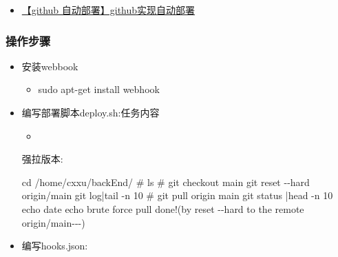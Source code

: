 \documentclass[
]{article}
\newenvironment{Shaded}{}{}
\newcommand{\NormalTok}[1]{#1}
\begin{document}
\begin{itemize}
\item
  \href{https://cloud.tencent.com/developer/article/1893950}{【github
  自动部署】github实现自动部署 }
\end{itemize}

\hypertarget{ux64cdux4f5cux6b65ux9aa4}{%
\subsubsection{操作步骤}\label{ux64cdux4f5cux6b65ux9aa4}}

\begin{itemize}
\item
  安装webbook

  \begin{itemize}
  \item
\begin{Shaded}
\begin{Highlighting}[]
\NormalTok{sudo apt{-}get install webhook}
\end{Highlighting}
\end{Shaded}
  \end{itemize}
\item
  编写部署脚本deploy.sh:任务内容

  \begin{itemize}
  \item
  \end{itemize}

\begin{Shaded}
\end{Shaded}

  强拉版本:

\begin{Shaded}
\begin{Highlighting}[]
\NormalTok{cd /home/cxxu/backEnd/}
\NormalTok{\# ls}
\NormalTok{\# git checkout main}
\NormalTok{git reset {-}{-}hard origin/main}
\NormalTok{git log|tail {-}n 10}
\NormalTok{\# git pull origin main}
\NormalTok{git status |head {-}n 10}
\NormalTok{echo \textasciigrave{}date\textasciigrave{}}
\NormalTok{echo \textquotesingle{}{-}{-}{-}{-}brute force pull done!(by reset {-}{-}hard to the remote origin/main{-}{-}{-})\textquotesingle{}}
\end{Highlighting}
\end{Shaded}
\item
  编写hooks.json:


\end{itemize}
\end{document}
